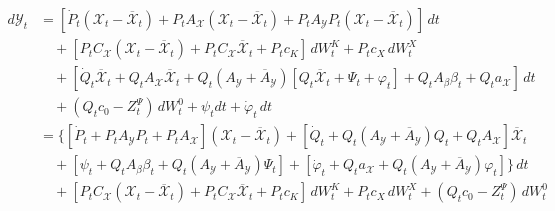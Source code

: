\documentclass[11pt,twoside]{amsart}
\theoremstyle{definition}
\numberwithin{equation}{section}
\begin{document}
\begin{align}\label{eq:iniz_coef_dY}
    d{\mathcal{Y}}_t & = \left[ \dot{P}_t ({\mathcal{X}}_t - \overline{{\mathcal{X}}}_t) + {P}_t A_{\mathcal{X}} ({\mathcal{X}}_t - \overline{{\mathcal{X}}}_t) + {P}_t A_{\mathcal{Y}} {P}_t({\mathcal{X}}_t - \overline{{\mathcal{X}}}_t)\right]\,dt \\
    \nonumber
    & \quad + \left[{P}_t C_{\mathcal{X}}({\mathcal{X}}_t - \overline{{\mathcal{X}}}_t) + {P}_t C_{\mathcal{X}} \overline{{\mathcal{X}}}_t +P_tc_K\right]\,dW_t^{K} +P_tc_X\,dW_t^{X} \\
    \nonumber
    &\quad +\left[ \dot{Q}_t\overline{{\mathcal{X}}}_t + Q_t A_{\mathcal{X}} \overline{{\mathcal{X}}}_t + Q_t (A_{\mathcal{Y}} + \overline{A}_{\mathcal{Y}})\left[Q_t \overline{{\mathcal{X}}}_t + \Psi_t + \varphi_t\right]+ Q_t A_\beta \beta_t + Q_t a_\mathcal{X}\right]\,dt \\
    \nonumber
    &\quad + (Q_t c_{0}-Z^\Psi_t)\,dW_t^{0} +\psi_t dt+ \dot{\varphi}_t\,dt\\
    \nonumber
    & = \Big\{ \left[\dot{{P}}_t +{P}_t A_{\mathcal{Y}} {P}_t + {P}_t A_{\mathcal{X}}\right]({\mathcal{X}}_t - \overline{{\mathcal{X}}}_t) + \left[ \dot{Q}_t + Q_t (A_{\mathcal{Y}}+ \overline{A}_{\mathcal{Y}}) Q_t + Q_t A_{\mathcal{X}} \right] \overline{{\mathcal{X}}}_t \\ 
    \nonumber
    &\quad  +\left[ \psi_t + Q_t A_\beta \beta_t + Q_t (A_{\mathcal{Y}}+ \overline{A}_{\mathcal{Y}})\Psi_t \right] + \left[\dot{\varphi}_t +Q_t a_\mathcal{X} + Q_t (A_{\mathcal{Y}}+ \overline{A}_{\mathcal{Y}})\varphi_t\right] \Big\}\,dt\\  
    \nonumber
    & \quad + \left[{P}_t C_{\mathcal{X}}({\mathcal{X}}_t - \overline{{\mathcal{X}}}_t) + {P}_t C_{\mathcal{X}} \overline{{\mathcal{X}}}_t +P_tc_K\right]\,dW_t^{K} +P_tc_X\,dW_t^{X} + (Q_t c_{0}-Z^\Psi_t)\,dW_t^{0}
\end{align}
\end{document}
